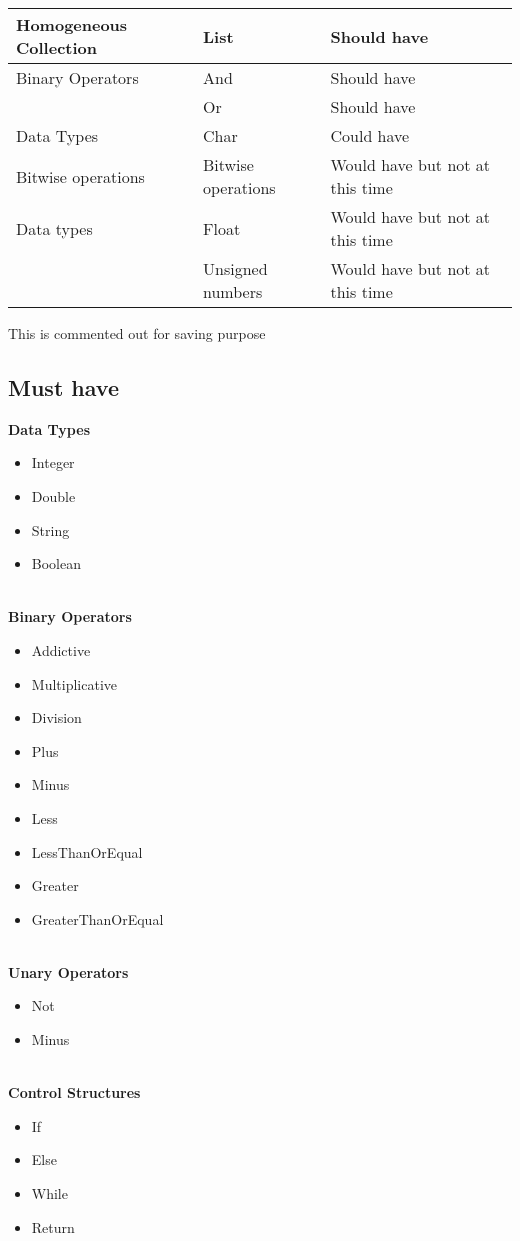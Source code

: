 \begin{table}[H]
\begin{tabular}{@{}lll@{}}
Homogeneous Collection & List                  & Should have                     \\ \midrule
Binary Operators       & And                   & Should have                     \\
                       & Or                    & Should have                     \\ \midrule
Data Types             & Char                  & Could have                      \\\midrule
Bitwise operations     & Bitwise operations    & Would have but not at this time \\
Data types             & Float                 & Would have but not at this time \\
                       & Unsigned numbers      & Would   have but not at this time \\ \bottomrule
\end{tabular}
\end{table}

\iffalse 
This is commented out for saving purpose
\subsection{Must have}
\textbf{Data Types} 

\begin{itemize} 
    \item Integer
    \item Double
    \item String
    \item Boolean
\end{itemize} 
\\
\textbf{Binary Operators} \\
\begin{itemize} 
    \item Addictive
    \item Multiplicative
    \item Division
    \item Plus
    \item Minus
    \item Less
    \item LessThanOrEqual
    \item Greater
    \item GreaterThanOrEqual
\end{itemize} 
\\
\textbf{Unary Operators} \\
\begin{itemize} 
    \item Not
    \item Minus
\end{itemize}
\\
\textbf{Control Structures} \\
\begin{itemize} 
    \item If
    \item Else
    \item While
    \item Return
\end{itemize} 
\\
